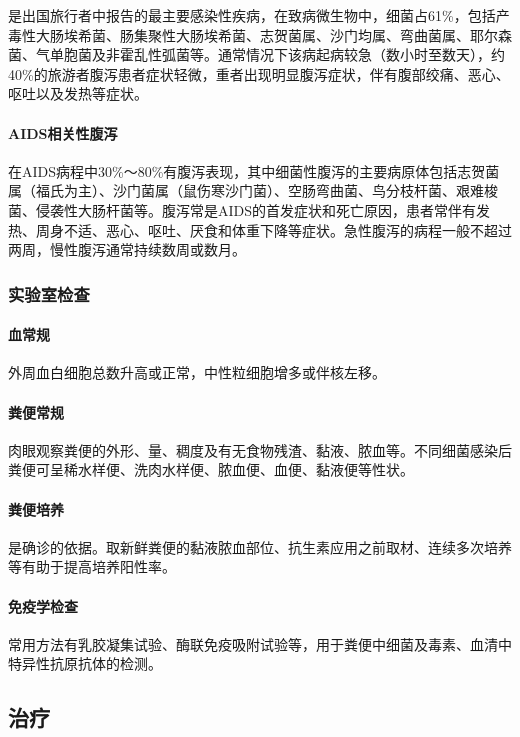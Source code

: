 是出国旅行者中报告的最主要感染性疾病，在致病微生物中，细菌占61\%，包括产毒性大肠埃希菌、肠集聚性大肠埃希菌、志贺菌属、沙门均属、弯曲菌属、耶尔森菌、气单胞菌及非霍乱性弧菌等。通常情况下该病起病较急（数小时至数天），约40\%的旅游者腹泻患者症状轻微，重者出现明显腹泻症状，伴有腹部绞痛、恶心、呕吐以及发热等症状。

\paragraph{AIDS相关性腹泻}

在AIDS病程中30\%～80\%有腹泻表现，其中细菌性腹泻的主要病原体包括志贺菌属（福氏为主）、沙门菌属（鼠伤寒沙门菌）、空肠弯曲菌、鸟分枝杆菌、艰难梭菌、侵袭性大肠杆菌等。腹泻常是AIDS的首发症状和死亡原因，患者常伴有发热、周身不适、恶心、呕吐、厌食和体重下降等症状。急性腹泻的病程一般不超过两周，慢性腹泻通常持续数周或数月。

\subsubsection{实验室检查}

\paragraph{血常规}

外周血白细胞总数升高或正常，中性粒细胞增多或伴核左移。

\paragraph{粪便常规}

肉眼观察粪便的外形、量、稠度及有无食物残渣、黏液、脓血等。不同细菌感染后粪便可呈稀水样便、洗肉水样便、脓血便、血便、黏液便等性状。

\paragraph{粪便培养}

是确诊的依据。取新鲜粪便的黏液脓血部位、抗生素应用之前取材、连续多次培养等有助于提高培养阳性率。

\paragraph{免疫学检查}

常用方法有乳胶凝集试验、酶联免疫吸附试验等，用于粪便中细菌及毒素、血清中特异性抗原抗体的检测。

\subsection{治疗}

